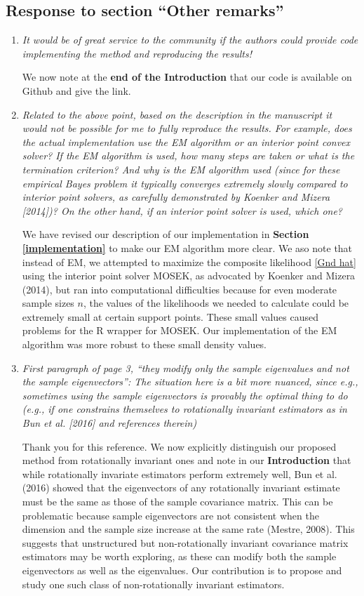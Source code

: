 \documentclass[12pt]{article}
\begin{document}
\subsection{Response to section ``Other remarks''}
\begin{enumerate}
\item \emph{It would be of great service to the community if the authors could provide code implementing the method and reproducing the results!}

  We now note at the \textbf{end of the Introduction} that our code is available on Github and give the link.
  
\item \emph{Related to the above point, based on the description in the manuscript it would not be possible for me to fully reproduce the results. For example, does the actual implementation use the EM algorithm or an interior point convex solver? If the EM algorithm is used, how many steps are taken or what is the termination criterion? And why is the EM algorithm used (since for these empirical Bayes problem it typically converges extremely slowly compared to interior point solvers, as carefully demonstrated by Koenker and Mizera [2014])? On the other hand, if an interior point solver is used, which one?}

  We have revised our description of our implementation in \textbf{Section \ref{implementation}} to make our EM algorithm more clear. We aso note that instead of EM, we attempted to maximize the composite likelihood \eqref{Gnd hat} using the interior point solver MOSEK, as advocated by Koenker and Mizera (2014), but ran into computational difficulties because for even moderate sample sizes $n$, the values of the likelihoods we needed to calculate could be extremely small at certain support points. These small values caused problems for the R wrapper for MOSEK. Our implementation of the EM algorithm was more robust to these small density values.
  
\item \emph{First paragraph of page 3, ``they modify only the sample eigenvalues and not the sample eigenvectors'': The situation here is a bit more nuanced, since e.g., sometimes using the sample eigenvectors is provably the optimal thing to do (e.g., if one constrains themselves to rotationally invariant estimators as in Bun et al. [2016] and references therein)}

  Thank you for this reference. We now explicitly distinguish our proposed method from rotationally invariant ones and note in our \textbf{Introduction} that while rotationally invariate estimators perform extremely well, Bun et al. (2016) showed that the eigenvectors of any rotationally invariant estimate must be the same as those of the sample covariance matrix. This can be problematic because sample eigenvectors are not consistent when the dimension and the sample size increase at the same rate  (Mestre, 2008). This suggests that unstructured but non-rotationally invariant covariance matrix estimators may be worth exploring, as these can modify both the sample eigenvectors as well as the eigenvalues. Our contribution is to propose and study one such class of non-rotationally invariant estimators.


\end{enumerate}
\end{document}
